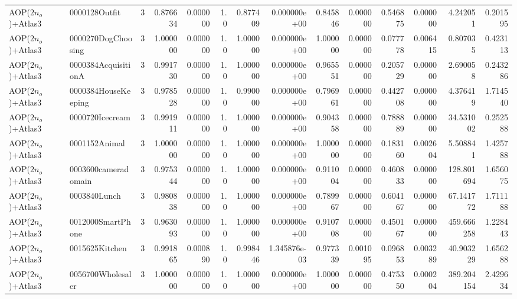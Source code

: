 \begin{tabular}{llrr|r|rr|rr|rr|rrr}
      AOP($2 n_o$)+Atlas3 &          0000128Outfit &       3 & 0.876634 & 0.000000 &  1.0 &      0.877409 & 0.000000e+00 &      0.845846 & 0.000000 &      0.546875 &    0.000000 &     4.242051 &    0.201595 \\
      AOP($2 n_o$)+Atlas3 &     0000270DogChoosing &       3 & 1.000000 & 0.000000 &  1.0 &      1.000000 & 0.000000e+00 &      1.000000 & 0.000000 &      0.077778 &    0.006415 &     0.807035 &    0.423113 \\
      AOP($2 n_o$)+Atlas3 &    0000384AcquisitionA &       3 & 0.991730 & 0.000000 &  1.0 &      1.000000 & 0.000000e+00 &      0.965551 & 0.000000 &      0.205729 &    0.000000 &     2.690058 &    0.243286 \\
      AOP($2 n_o$)+Atlas3 &    0000384HouseKeeping &       3 & 0.978528 & 0.000000 &  1.0 &      0.990000 & 0.000000e+00 &      0.796961 & 0.000000 &      0.442708 &    0.000000 &     4.376419 &    1.714540 \\
      AOP($2 n_o$)+Atlas3 &        0000720Icecream &       3 & 0.991911 & 0.000000 &  1.0 &      1.000000 & 0.000000e+00 &      0.904358 & 0.000000 &      0.788889 &    0.000000 &    34.531002 &    0.252588 \\
      AOP($2 n_o$)+Atlas3 &          0001152Animal &       3 & 1.000000 & 0.000000 &  1.0 &      1.000000 & 0.000000e+00 &      1.000000 & 0.000000 &      0.183160 &    0.002604 &     5.508841 &    1.425788 \\
      AOP($2 n_o$)+Atlas3 &    0003600cameradomain &       3 & 0.975344 & 0.000000 &  1.0 &      1.000000 & 0.000000e+00 &      0.911004 & 0.000000 &      0.460833 &    0.000000 &   128.801694 &    1.656075 \\
      AOP($2 n_o$)+Atlas3 &           0003840Lunch &       3 & 0.980838 & 0.000000 &  1.0 &      1.000000 & 0.000000e+00 &      0.789967 & 0.000000 &      0.604167 &    0.000000 &    67.141772 &    1.711188 \\
      AOP($2 n_o$)+Atlas3 &      0012000SmartPhone &       3 & 0.963093 & 0.000000 &  1.0 &      1.000000 & 0.000000e+00 &      0.910708 & 0.000000 &      0.450167 &    0.000000 &   459.666258 &    1.228443 \\
      AOP($2 n_o$)+Atlas3 &         0015625Kitchen &       3 & 0.991865 & 0.000890 &  1.0 &      0.998446 & 1.345876e-03 &      0.977339 & 0.001095 &      0.096853 &    0.003289 &    40.903229 &    1.656288 \\
      AOP($2 n_o$)+Atlas3 &      0056700Wholesaler &       3 & 1.000000 & 0.000000 &  1.0 &      1.000000 & 0.000000e+00 &      1.000000 & 0.000000 &      0.475350 &    0.000204 &   389.204154 &    2.429634 \\

\end{tabular}
